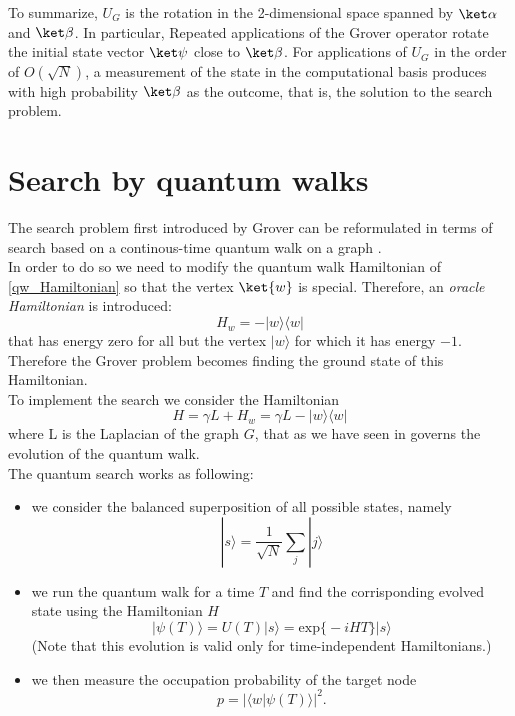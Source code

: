\noindent
To summarize, $U_G$ is the rotation in the 2-dimensional space spanned by $\kalpha$ and $\kbeta$. In particular, Repeated applications of the Grover operator rotate the initial state vector $\kpsi$ close to $\kbeta$. For applications of $U_G$ in the order of $O(\sqrt{N})$, a measurement of the state in the computational basis produces with high probability $\kbeta$ as the outcome, that is, the solution to the search problem.


\section{Search by quantum walks}\label{sec:search quantum walk}
The search problem first introduced by Grover can be reformulated in terms of search based on a continous-time quantum walk on a graph \cite{Childs2004}. \\In order to do so we need to modify the quantum walk Hamiltonian of \cref{qw_Hamiltonian} so that the vertex $\ket{w}$ is special. Therefore, an \textit{oracle Hamiltonian} is introduced:
\begin{equation}
  H_w = -|w\rangle\langle w|
\end{equation}
that has energy zero for all but the vertex $|w\rangle$ for which it has energy $-1$. Therefore the Grover problem becomes finding the ground state of this Hamiltonian. \\To implement the search we consider the Hamiltonian
\begin{equation}
  H = \gamma L + H_w = \gamma L -|w\rangle\langle w|
\end{equation}
where L is the Laplacian of the graph $G$, that as we have seen in  governs the evolution of the quantum walk.\\
The quantum search works as following:
\begin{itemize}
  \item we consider the balanced superposition of all possible states, namely
  \begin{equation}
    |s\rangle = \frac{1}{\sqrt{N}}\sum_j|j\rangle
  \end{equation}

  \item we run the quantum walk for a time $T$ and find the corrisponding evolved state using the Hamiltonian $H$
  \begin{equation}
  |\psi(T)\rangle = U(T)|s\rangle  = \mbox{exp}\Big\{-iHT\Big\}|s\rangle
  \end{equation}
  (Note that this evolution is valid only for time-independent Hamiltonians.)

  \item we then measure the occupation probability of the target node
  \begin{equation}
    p = |\langle w|\psi(T)\rangle|^2.
  \end{equation}

\end{itemize}
